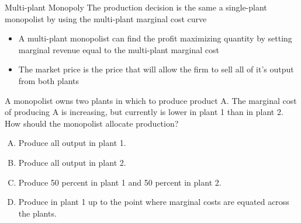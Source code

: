 \documentclass[11pt,t]{beamer}
\begin{document}
\begin{frame}{Multi-plant Monopoly}
  The production decision is the same a single-plant monopolist by using the multi-plant marginal cost curve

  \begin{itemize}
    \item A multi-plant monopolist can find the profit maximizing quantity by setting marginal revenue equal to the multi-plant marginal cost
    
    \item The market price is the price that will allow the firm to sell all of it's output from both plants
  \end{itemize}
\end{frame}

\begin{frame}{}
  A monopolist owns two plants in which to produce product A.  The marginal cost of producing A is increasing, but currently is lower in plant 1 than in plant 2.  How should the monopolist allocate production?

  \begin{enumerate}[A)]
    \item Produce all output in plant 1.
    \item Produce all output in plant 2.
    \item Produce 50 percent in plant 1 and 50 percent in plant 2.
    \item Produce in plant 1 up to the point where marginal costs are equated across the plants.
  \end{enumerate}
\end{frame}






\end{document}
